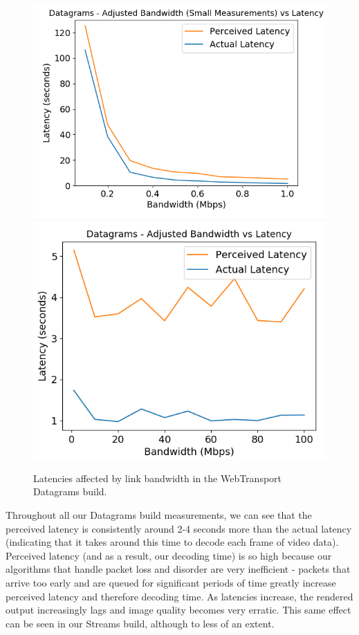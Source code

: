 \begin{figure}[h]
    \centering
    \includegraphics[width=0.52\linewidth]{images/bandwidth/dg-bw-lat-small.png}    
    \includegraphics[width=0.46\linewidth]{images/bandwidth/dg-bw-lat.png}    
    \caption{Latencies affected by link bandwidth in the WebTransport Datagrams build.}

    \label{fig:dg-bw-lat} 
\end{figure}

Throughout all our Datagrams build measurements, we can see that the perceived latency is consistently around 2-4 seconds more than the actual latency (indicating that it takes around this time to decode each frame of video data). Perceived latency (and as a result, our decoding time) is so high because our algorithms that handle packet loss and disorder are very inefficient - packets that arrive too early and are queued for significant periods of time greatly increase perceived latency and therefore decoding time. As latencies increase, the rendered output increasingly lags and image quality becomes very erratic. This same effect can be seen in our Streams build, although to less of an extent.

